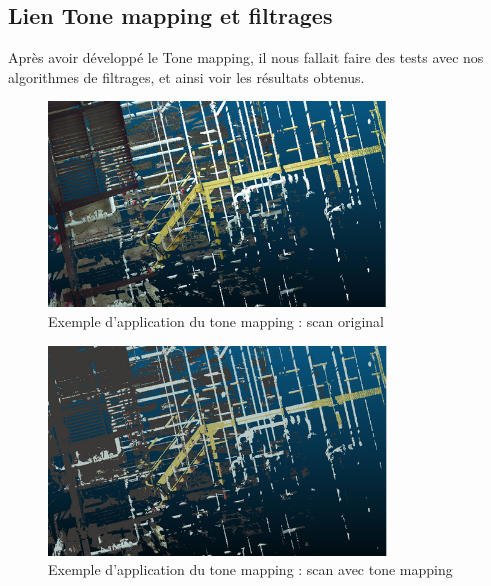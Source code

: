 \documentclass[12pt,titlepage,french]{article}
\begin{document}
\subsection{Lien Tone mapping et filtrages}
Après avoir développé le Tone mapping, il nous fallait faire des tests avec nos algorithmes de filtrages, et ainsi voir les résultats obtenus.

\begin{figure}[H]
 \caption{\label{}  Exemple d'application du tone mapping : scan original}
 \begin{center}
 \includegraphics[width=0.8\textwidth]{./img/tm_example_1.PNG}
  \end{center}
\end{figure}

\begin{figure}[H]
 \caption{\label{}  Exemple d'application du tone mapping : scan avec tone mapping}
 \begin{center}
 \includegraphics[width=0.8\textwidth]{./img/tm_example_2.PNG}
  \end{center}
\end{figure}
\end{document}
